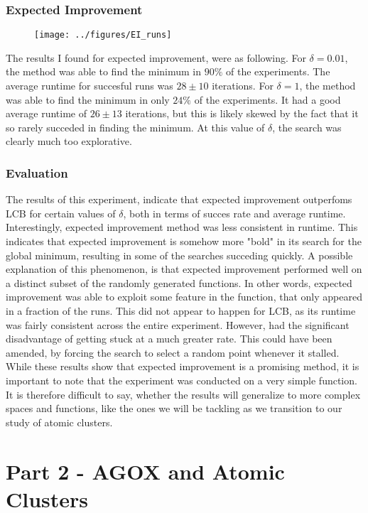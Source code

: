 \documentclass[working, oneside]{../../../Preambles/marginclass}
\begin{document}
\subsection{Expected Improvement}
\begin{figure}[htpb]
    \centering
    \texttt{[image: ../figures/EI\_runs]}
    \label{fig:}
\end{figure}
The results I found for expected improvement, were as following. For $\delta = 0.01$, the method was able to find the minimum in $90\%$ of the experiments. The average runtime for succesful runs was $28 \pm 10$ iterations. For $\delta = 1$, the method was able to find the minimum in only $24\%$ of the experiments. It had a good average runtime of $26 \pm 13$ iterations, but this is likely skewed by the fact that it so rarely succeded in finding the minimum. At this value of $\delta$, the search was clearly much too explorative.
\subsection{Evaluation}
The results of this experiment, indicate that expected improvement outperfoms LCB for certain values of $\delta$, both in terms of succes rate and average runtime. Interestingly, expected improvement method was less consistent in runtime. This indicates that expected improvement is somehow more "bold" in its search for the global minimum, resulting in some of the searches succeding quickly. A possible explanation of this phenomenon, is that expected improvement performed well on a distinct subset of the randomly generated functions. In other words, expected improvement was able to exploit some feature in the function, that only appeared in a fraction of the runs. This did not appear to happen for LCB, as its runtime was fairly consistent across the entire experiment. However, had the significant disadvantage of getting stuck at a much greater rate. This could have been amended, by forcing the search to select a random point whenever it stalled. \\
While these results show that expected improvement is a promising method, it is important to note that the experiment was conducted on a very simple function. It is therefore difficult to say, whether the results will generalize to more complex spaces and functions, like the ones we will be tackling as we transition to our study of atomic clusters.
\newpage
\restoregeometry
\chapter{Part 2 - AGOX and Atomic Clusters}
\end{document}
